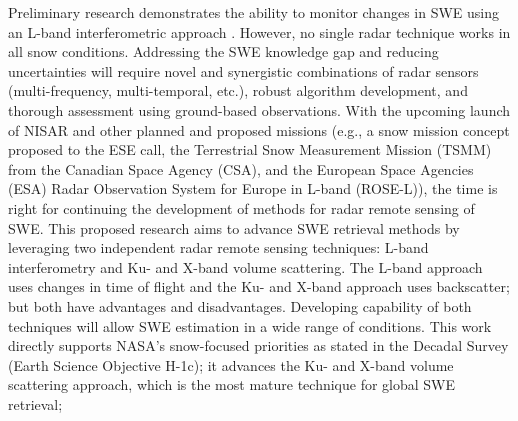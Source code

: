 Preliminary research demonstrates the ability to monitor changes in SWE using an L-band interferometric approach \citep{guneriussenInSAREstimationChanges2001,rottSnowMassRetrieval2003,deebMonitoringSnowpackEvolution2011}. However, no single radar technique works in all snow conditions. Addressing the SWE knowledge gap and reducing uncertainties will require novel and synergistic combinations of radar sensors (multi-frequency, multi-temporal, etc.), robust algorithm development, and thorough assessment using ground-based observations.
With the upcoming launch of NISAR and other planned and proposed missions (e.g., a snow mission concept proposed to the ESE call, the Terrestrial Snow Measurement Mission (TSMM) from the Canadian Space Agency (CSA), and the European Space Agencies (ESA) Radar Observation System for Europe in L-band (ROSE-L)), the time is right for continuing the development of methods for radar remote sensing of SWE. This proposed research aims to advance SWE retrieval methods by leveraging two independent radar remote sensing techniques: L-band interferometry and Ku- and X-band volume scattering. The L-band approach uses changes in time of flight and the Ku- and X-band approach uses backscatter; but both have advantages and disadvantages. Developing capability of both techniques will allow SWE estimation in a wide range of conditions. This work directly supports NASA’s snow-focused priorities as stated in the Decadal Survey (Earth Science Objective H-1c); it advances the Ku- and X-band volume scattering approach, which is the most mature technique for global SWE retrieval;








